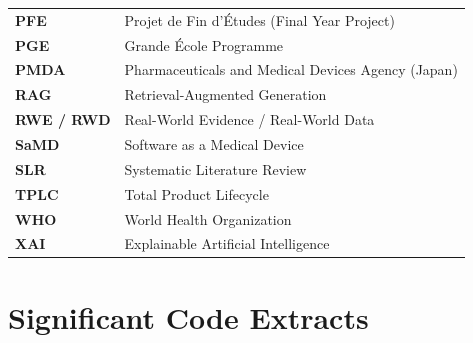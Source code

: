 \documentclass[12pt,a4paper,oneside]{report}
\begin{document}
\begin{tabular}{@{}>{\bfseries}p{}p{}@{}}
PFE & Projet de Fin d'\'Etudes (Final Year Project) \\
PGE & Grande \'Ecole Programme \\
PMDA & Pharmaceuticals and Medical Devices Agency (Japan) \\
RAG & Retrieval-Augmented Generation \\
RWE / RWD & Real-World Evidence / Real-World Data \\
SaMD & Software as a Medical Device \\
SLR & Systematic Literature Review \\
TPLC & Total Product Lifecycle \\
WHO & World Health Organization \\
XAI & Explainable Artificial Intelligence \\
\end{tabular}

\clearpage

\pagestyle{fancy}

















{\small
\printbibliography[heading=bibintoc,title={Bibliography}]
}

\appendix
\renewcommand{\chaptername}{Appendix}

\chapter{Significant Code Extracts}
\label{app:code}

\end{document}
